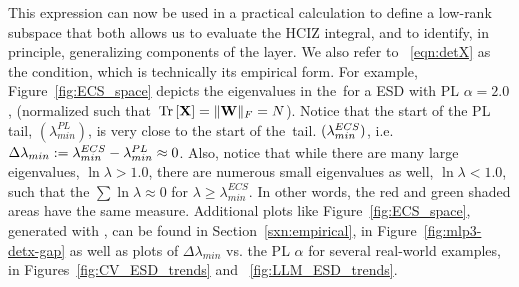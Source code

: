 This expression can now be used in a practical calculation to define a low-rank subspace that both allows us to evaluate the HCIZ integral,
and to identify, in principle, generalizing components of the layer.
We also refer to \EQN~\ref{eqn:detX} as the \TRACELOG condition, which is technically its empirical form.
For example, Figure~\ref{fig:ECS_space} depicts the eigenvalues in the~\ECS for a \Typical ESD with PL $\alpha=2.0$,
(normalized such that $\mbox{}\operatorname{Tr}\left[\mathbf{X}\right]=\Vert{\mathbf{W}}\Vert_{F}=N$).
Notice that the start of the PL tail, $(\lambda_{min}^{PL})$, is very close to the start of the~\ECS tail. $(\lambda^{ECS}_{min})$,
i.e. $\Delta \lambda_{min}:=\lambda^{ECS}_{min}-\lambda^{PL}_{min}\approx 0$.
Also, notice that while there are many large eigenvalues, $\ln\lambda>1.0$, there are numerous small eigenvalues as well,
$\ln\lambda<1.0$, such that the $\sum\ln\lambda\approx 0$ for $\lambda\ge\lambda_{min}^{ECS}$. In other words, the red and green shaded areas have the same measure.
Additional plots like Figure~\ref{fig:ECS_space}, generated with \WW,  can be found in Section~\ref{sxn:empirical},
in Figure~\ref{fig:mlp3-detx-gap}
as well as plots of $\Delta \lambda_{min}$ vs. the \WW PL $\alpha$ for several real-world examples,
in Figures~\ref{fig:CV_ESD_trends} and ~\ref{fig:LLM_ESD_trends}.

